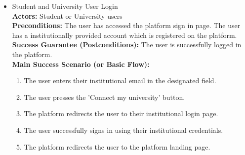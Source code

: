 \begin{itemize}[label={[\textbf{UC}]}, align=left, leftmargin=*]
\newpage
    \item {} Student and University User Login\\
     \textbf{Actors:} Student or University users\\
     \textbf{Preconditions:} The user has accessed the platform sign in page. The user has a institutionally provided account which is registered on the platform.\\
     \textbf{Success Guarantee (Postconditions):} The user is successfully logged in the platform.\\
     \textbf{Main Success Scenario (or Basic Flow):} 
     \begin{enumerate}[label=\arabic*.] 
        \item The user enters their institutional email in the designated field.
        \item The user presses the 'Connect my university' button.
        \item The platform redirects the user to their institutional login page.
        \item The user successfully signs in using their institutional credentials.
        \item The platform redirects the user to the platform landing page.
     \end{enumerate} \\


\end{itemize}
